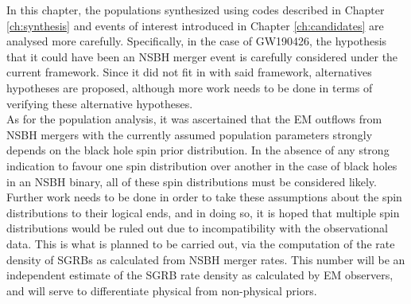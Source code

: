     In this chapter, the populations synthesized using codes described in Chapter
    \ref{ch:synthesis} and events of interest introduced in Chapter \ref{ch:candidates}
    are analysed more carefully. Specifically, in the case of GW190426, the hypothesis
    that it could have been an NSBH merger event is carefully considered under the
    current framework. Since it did not fit in with said framework, alternatives
    hypotheses are proposed, although more work needs to be done in terms of verifying
    these alternative hypotheses.\\
    As for the population analysis, it was ascertained that the EM outflows from NSBH
    mergers with the currently assumed population parameters strongly depends on the
    black hole spin prior distribution. In the absence of any strong indication to
    favour one spin distribution over another in the case of black holes in an NSBH
    binary, all of these spin distributions must be considered likely. Further work
    needs to be done in order to take these assumptions about the spin distributions to
    their logical ends, and in doing so, it is hoped that multiple spin distributions
    would be ruled out due to incompatibility with the observational data. This is what
    is planned to be carried out, via the computation of the rate density of SGRBs as
    calculated from NSBH merger rates. This number will be an independent estimate of
    the SGRB rate density as calculated by EM observers, and will serve to differentiate
    physical from non-physical priors.
